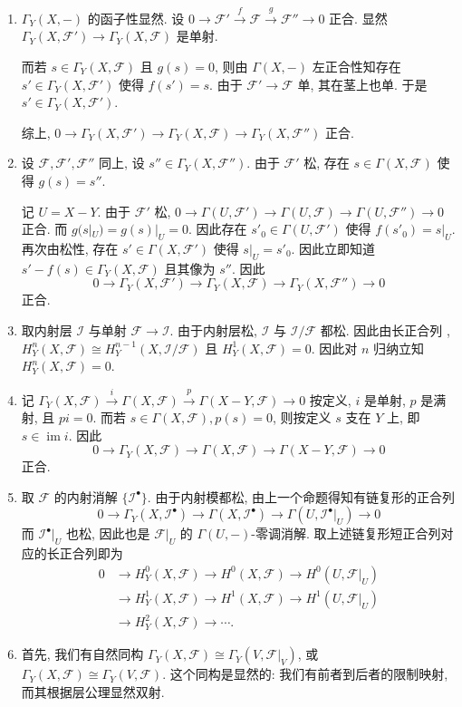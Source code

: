 \documentclass{article}
\theoremstyle{exercise}
\theoremstyle{plain}
\theoremstyle{remark}
\newenvironment{proofc}{\proof}{\endproof}
\def\cF{\mathscr{F}}
\def\cI{\mathscr{I}}
\def\im{\operatorname{im}}
\begin{document}
\begin{proofc} \hfill
  \begin{enumerate}[label=(\arabic*)]
    \item $\Gamma_Y(X, -)$ 的函子性显然.
          设 $0 \to \cF' \xrightarrow{f} \cF \xrightarrow{g} \cF'' \to 0$ 正合.
          显然 $\Gamma_Y(X, \cF') \to \Gamma_Y(X, \cF)$ 是单射.

          而若 $s \in \Gamma_Y(X, \cF)$ 且 $g(s) = 0$,
          则由 $\Gamma(X, -)$ 左正合性知存在 $s' \in \Gamma_Y(X, \cF')$ 使得 $f(s') = s$.
          由于 $\cF' \to \cF$ 单, 其在茎上也单. 于是 $s' \in \Gamma_Y(X, \cF')$.

          综上, $0 \to \Gamma_Y(X, \cF') \to \Gamma_Y(X, \cF) \to \Gamma_Y(X, \cF'')$
          正合.
    \item 设 $\cF, \cF', \cF''$ 同上, 设  $s'' \in \Gamma_Y(X, \cF'')$.
          由于 $\cF'$ 松, 存在 $s \in \Gamma(X, \cF)$ 使得 $g(s) = s''$.

          记  $U = X - Y$. 由于 $\cF'$ 松,
          $0 \to \Gamma(U, \cF') \to \Gamma(U, \cF) \to \Gamma(U, \cF'') \to 0$ 正合.
          而 $g(s|_U) = g(s)|_U = 0$. 因此存在  $s'_0 \in \Gamma(U, \cF')$
          使得 $f(s'_0) = s|_U$. 再次由松性, 存在 $s' \in \Gamma(X, \cF')$
          使得 $s|_U = s'_0$. 因此立即知道 $s' - f(s) \in \Gamma_Y(X, \cF)$
          且其像为 $s''$. 因此
          \[ 0 \to \Gamma_Y(X, \cF') \to \Gamma_Y(X, \cF) \to \Gamma_Y(X, \cF'') \to 0 \]
          正合.
    \item 取内射层 $\cI$ 与单射 $\cF \to \cI$. 由于内射层松, $\cI$ 与 $\cI / \cF$ 都松.
          因此由长正合列 , $H_Y^n(X, \cF) \cong H_Y^{n-1}(X, \cI / \cF)$
          且 $H_Y^1(X, \cF) = 0$.
          因此对 $n$ 归纳立知 $H_Y^n(X, \cF) = 0$.
    \item 记
          $\Gamma_Y(X, \cF) \xrightarrow{i} \Gamma(X, \cF)
          \xrightarrow{p} \Gamma(X - Y, \cF) \to 0$
          按定义, $i$ 是单射, $p$ 是满射, 且 $pi = 0$.
          而若 $s \in \Gamma(X, \cF), p(s) = 0$, 则按定义 $s$ 支在 $Y$ 上,
          即 $s \in \im i$. 因此
          \[ 0 \to \Gamma_Y(X, \cF) \to \Gamma(X, \cF) \to \Gamma(X - Y, \cF) \to 0 \]
          正合.
    \item 取 $\cF$ 的内射消解 $\{\cI^\bullet\}$.
          由于内射模都松, 由上一个命题得知有链复形的正合列
          \[
          0 \to \Gamma_Y(X, \cI^\bullet)
          \to \Gamma(X, \cI^\bullet)
          \to \Gamma(U, \cI^\bullet|_U) \to 0
          \]
          而 $\cI^\bullet|_U$ 也松, 因此也是 $\cF|_U$ 的 $\Gamma(U, -)$-零调消解.
          取上述链复形短正合列对应的长正合列即为
          \begin{align*}
            0 & \to H_Y^0(X, \cF) \to H^0(X, \cF) \to H^0(U, \cF|_U) \\
              & \to H_Y^1(X, \cF) \to H^1(X, \cF) \to H^1(U, \cF|_U) \\
              & \to H_Y^2(X, \cF) \to \cdots.
          \end{align*}
    \item 首先, 我们有自然同构 $\Gamma_Y(X, \cF) \cong \Gamma_Y(V, \cF|_V)$,
          或 $\Gamma_Y(X, \cF) \cong \Gamma_Y(V, \cF)$.
          这个同构是显然的: 我们有前者到后者的限制映射, 而其根据层公理显然双射.


\end{enumerate}
\end{proofc}
\end{document}
